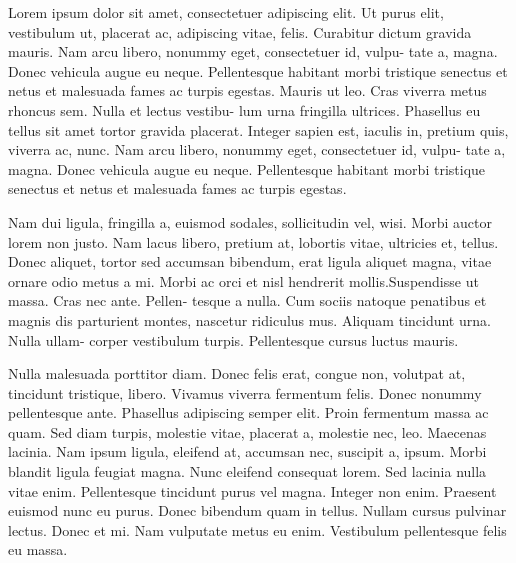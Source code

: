 \documentclass[12pt]{scrartcl}
\begin{document}
Lorem ipsum dolor sit amet, consectetuer adipiscing elit. Ut purus elit,
vestibulum ut, placerat ac, adipiscing vitae, felis. Curabitur dictum
gravida mauris. Nam arcu libero, nonummy eget, consectetuer id, vulpu-
tate a, magna. Donec vehicula augue eu neque. Pellentesque habitant morbi
tristique senectus et netus et malesuada fames ac turpis egestas. Mauris
ut leo. Cras viverra metus rhoncus sem. Nulla et lectus vestibu- lum urna
fringilla ultrices. Phasellus eu tellus sit amet tortor gravida placerat.
Integer sapien est, iaculis in, pretium quis, viverra ac, nunc. Nam arcu
libero, nonummy eget, consectetuer id, vulpu- tate a, magna. Donec
vehicula augue eu neque. Pellentesque habitant morbi tristique senectus et
netus et malesuada fames ac turpis egestas.

Nam dui ligula, fringilla a, euismod sodales, sollicitudin vel, wisi.
Morbi auctor lorem non justo. Nam lacus libero, pretium at, lobortis
vitae, ultricies et, tellus. Donec aliquet, tortor sed accumsan bibendum,
erat ligula aliquet magna, vitae ornare odio metus a mi. Morbi ac orci et
nisl hendrerit mollis.Suspendisse ut massa. Cras nec ante. Pellen- tesque
a nulla. Cum sociis natoque penatibus et magnis dis parturient montes,
nascetur ridiculus mus. Aliquam tincidunt urna. Nulla ullam- corper
vestibulum turpis. Pellentesque cursus luctus
mauris.

Nulla malesuada porttitor diam. Donec felis erat, congue non, volutpat at,
tincidunt tristique, libero. Vivamus viverra fermentum felis. Donec
nonummy pellentesque ante. Phasellus adipiscing semper elit. Proin
fermentum massa ac quam. Sed diam turpis, molestie vitae, placerat a,
molestie nec, leo. Maecenas lacinia. Nam ipsum ligula, eleifend at,
accumsan nec, suscipit a, ipsum. Morbi blandit ligula feugiat magna. Nunc
eleifend consequat lorem. Sed lacinia nulla vitae enim. Pellentesque
tincidunt purus vel magna. Integer non enim. Praesent euismod nunc eu
purus. Donec bibendum quam in tellus. Nullam cursus pulvinar lectus. Donec
et mi. Nam vulputate metus eu enim. Vestibulum pellentesque felis eu
massa.
\end{document}
